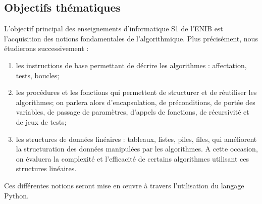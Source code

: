 \subsection{Objectifs thématiques}
L'objectif principal des enseignements d'informatique S1 de l'ENIB
est l'acquisition des notions fondamentales de l'algorithmique.
Plus précisément, nous étudierons successivement :
\begin{enumerate}
\item les instructions de base permettant de décrire les algorithmes : affectation, tests, boucles;
\item les procédures et les fonctions qui permettent de structurer et de réutiliser les algorithmes;
	on parlera alors d'encapsulation, de préconditions, de portée des variables, de passage de paramètres,
	d'appels de fonctions, de récursivité et de jeux de tests;
\item les structures de données linéaires : tableaux, listes, piles, files, qui améliorent la
	structuration des données manipulées par les algorithmes. A cette occasion, on évaluera
	la complexité et l'efficacité de certains algorithmes utilisant ces structures linéaires.
\end{enumerate}
Ces différentes notions seront mise en \oe uvre à travers l'utilisation du 
langage {\sc Python}.


